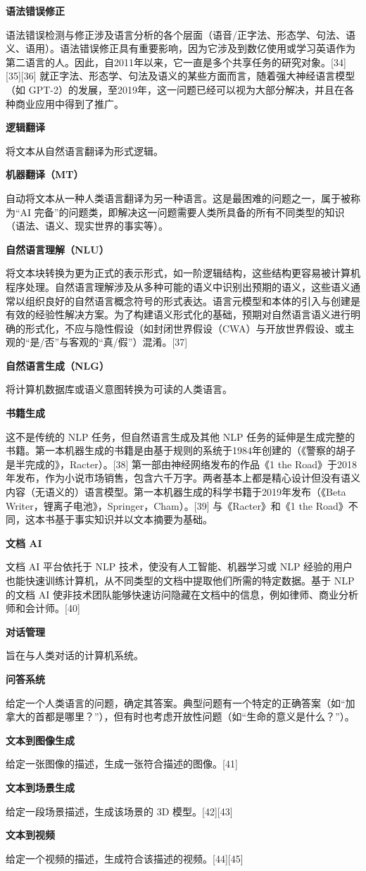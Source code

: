 \textbf{语法错误修正}  

语法错误检测与修正涉及语言分析的各个层面（语音/正字法、形态学、句法、语义、语用）。语法错误修正具有重要影响，因为它涉及到数亿使用或学习英语作为第二语言的人。因此，自2011年以来，它一直是多个共享任务的研究对象。[34][35][36] 就正字法、形态学、句法及语义的某些方面而言，随着强大神经语言模型（如 GPT-2）的发展，至2019年，这一问题已经可以视为大部分解决，并且在各种商业应用中得到了推广。

\textbf{逻辑翻译}  

将文本从自然语言翻译为形式逻辑。

\textbf{机器翻译（MT）}  

自动将文本从一种人类语言翻译为另一种语言。这是最困难的问题之一，属于被称为“AI 完备”的问题类，即解决这一问题需要人类所具备的所有不同类型的知识（语法、语义、现实世界的事实等）。

\textbf{自然语言理解（NLU）}  

将文本块转换为更为正式的表示形式，如一阶逻辑结构，这些结构更容易被计算机程序处理。自然语言理解涉及从多种可能的语义中识别出预期的语义，这些语义通常以组织良好的自然语言概念符号的形式表达。语言元模型和本体的引入与创建是有效的经验性解决方案。为了构建语义形式化的基础，预期对自然语言语义进行明确的形式化，不应与隐性假设（如封闭世界假设（CWA）与开放世界假设、或主观的“是/否”与客观的“真/假”）混淆。[37]

\textbf{自然语言生成（NLG）}  

将计算机数据库或语义意图转换为可读的人类语言。

\textbf{书籍生成} 

这不是传统的 NLP 任务，但自然语言生成及其他 NLP 任务的延伸是生成完整的书籍。第一本机器生成的书籍是由基于规则的系统于1984年创建的（《警察的胡子是半完成的》，Racter）。[38] 第一部由神经网络发布的作品《1 the Road》于2018年发布，作为小说市场销售，包含六千万字。两者基本上都是精心设计但没有语义内容（无语义的）语言模型。第一本机器生成的科学书籍于2019年发布（《Beta Writer，锂离子电池》，Springer，Cham）。[39] 与《Racter》和《1 the Road》不同，这本书基于事实知识并以文本摘要为基础。

\textbf{文档 AI}  

文档 AI 平台依托于 NLP 技术，使没有人工智能、机器学习或 NLP 经验的用户也能快速训练计算机，从不同类型的文档中提取他们所需的特定数据。基于 NLP 的文档 AI 使非技术团队能够快速访问隐藏在文档中的信息，例如律师、商业分析师和会计师。[40]

\textbf{对话管理}  

旨在与人类对话的计算机系统。

\textbf{问答系统}  

给定一个人类语言的问题，确定其答案。典型问题有一个特定的正确答案（如“加拿大的首都是哪里？”），但有时也考虑开放性问题（如“生命的意义是什么？”）。

\textbf{文本到图像生成} 

给定一张图像的描述，生成一张符合描述的图像。[41]

\textbf{文本到场景生成}  

给定一段场景描述，生成该场景的 3D 模型。[42][43]

\textbf{文本到视频}  

给定一个视频的描述，生成符合该描述的视频。[44][45]